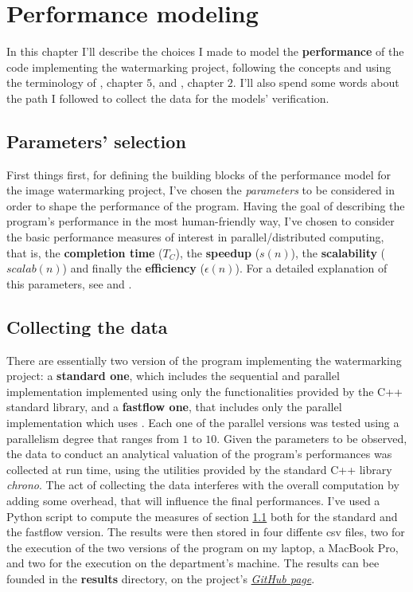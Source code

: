 \chapter{Performance modeling} %
\label{cha:performance_modeling}
    In this chapter I'll describe the choices I made to model the \textbf{performance} of the code implementing
    the watermarking project, following the concepts and using the terminology of \cite{DSPM}, chapter
    $5$, and \cite{spp}, chapter $2$. I'll also spend some words about the path I followed to collect the
    data for the models' verification.
    \section{Parameters' selection} %
    \label{sec:parameters}
        First things first, for defining the building blocks of the performance model for the image
        watermarking project, I've chosen the \textit{parameters} to be considered in order to shape the
        performance of the program. Having the goal of describing the program's performance in
        the most human-friendly way, I've chosen to consider the basic performance measures of interest in
        parallel/distributed computing, that is, the \textbf{completion time} ($T_C$), the \textbf{speedup}
        ($s(n)$), the \textbf{scalability} ($\mathit{scalab}(n)$) and finally the \textbf{efficiency}
        ($\epsilon(n)$). For a detailed explanation of this parameters, see \cite{DSPM} and \cite{spp}.

    \section{Collecting the data} %
    \label{sec:collecting_the_data}
        There are essentially two version of the program implementing the watermarking project: a
        \textbf{standard one}, which includes the sequential and parallel implementation implemented using only
        the functionalities provided by the C++ standard library, and a \textbf{fastflow one}, that includes only
        the parallel implementation which uses \cite{fastflow}. Each one of the parallel
        versions was tested using a parallelism degree that ranges from $1$ to $10$. Given the parameters to be
        observed, the data to conduct an analytical valuation of the program's performances was collected at run
        time, using the utilities provided by the standard C++ library \textit{chrono}. The act of collecting the
        data interferes with the overall computation by adding some overhead, that will influence the final
        performances. I've used a Python script to compute the measures of section \ref{sec:parameters} both for
        the standard and the fastflow version. The results were then stored in four diffente csv files, two for
        the execution of the two versions of the program on my laptop, a MacBook Pro, and two for the execution
        on the department's machine. The results can bee founded in the \textbf{results} directory, on the
        project's \href{https://github.com/germz01/PDS_project}{\textit{GitHub page}}.

